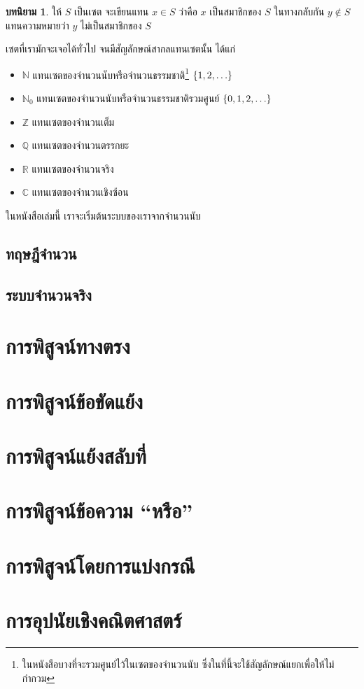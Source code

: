 \documentclass[a4paper,12pt]{extbook}
\theoremstyle{definition}
\newtheorem{definition}{บทนิยาม}[section]
\theoremstyle{remark}
\newcommand{\q}[1]{``#1''}
\DeclarePairedDelimiter{\Set}{\lbrace}{\rbrace}
\begin{document}
		\begin{definition}
			ให้ $S$ เป็นเซต จะเขียนแทน $x \in S$ ว่าคือ $x$ เป็นสมาชิกของ $S$ ในทางกลับกัน $y \notin S$ แทนความหมายว่า $y$ ไม่เป็นสมาชิกของ $S$
		\end{definition}
		เซตที่เรามักจะเจอได้ทั่วไป จนมีสัญลักษณ์สากลแทนเซตนั้น ได้แก่
		\begin{itemize}
			\item $\mathbb{N}$ แทนเซตของจำนวนนับหรือจำนวนธรรมชาติ\footnote{ในหนังสือบางที่จะรวมศูนย์ไว้ในเซตของจำนวนนับ ซึ่งในที่นี้จะใช้สัญลักษณ์แยกเพื่อให้ไม่กำกวม} $\Set{1, 2, \ldots}$
			\item $\mathbb{N}_0$ แทนเซตของจำนวนนับหรือจำนวนธรรมชาติรวมศูนย์ $\Set{0, 1, 2, \ldots}$
			\item $\mathbb{Z}$ แทนเซตของจำนวนเต็ม
			\item $\mathbb{Q}$ แทนเซตของจำนวนตรรกยะ
			\item $\mathbb{R}$ แทนเซตของจำนวนจริง
			\item $\mathbb{C}$ แทนเซตของจำนวนเชิงซ้อน
		\end{itemize}
		ในหนังสือเล่มนี้ เราจะเริ่มต้นระบบของเราจากจำนวนนับ 
		
		\section{ทฤษฎีจำนวน}
		\section{ระบบจำนวนจริง}
		
		\chapter{การพิสูจน์ทางตรง}
		
		\chapter{การพิสูจน์ข้อขัดแย้ง}
		
		\chapter{การพิสูจน์แย้งสลับที่}
		
		\chapter{การพิสูจน์ข้อความ \q{หรือ}}
		
		\chapter{การพิสูจน์โดยการแบ่งกรณี}
	
		\chapter{การอุปนัยเชิงคณิตศาสตร์}
\end{document}
